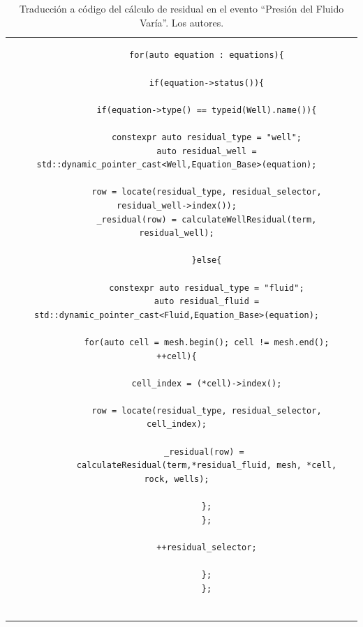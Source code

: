 \begin{appendix}
\begin{table}[h]
\begin{tabular}{cc}
\begin{tiny}
\begin{lstlisting}
			for(auto equation : equations){
			
			if(equation->status()){
			
			if(equation->type() == typeid(Well).name()){
			
			constexpr auto residual_type = "well";
			auto residual_well = std::dynamic_pointer_cast<Well,Equation_Base>(equation);
			
			row = locate(residual_type, residual_selector, residual_well->index());
			_residual(row) = calculateWellResidual(term, residual_well);
			
			}else{
			
			constexpr auto residual_type = "fluid";
			auto residual_fluid = std::dynamic_pointer_cast<Fluid,Equation_Base>(equation);
			
			for(auto cell = mesh.begin(); cell != mesh.end(); ++cell){
			
			cell_index = (*cell)->index();
			
			row = locate(residual_type, residual_selector, cell_index);
			
			_residual(row) = 
			calculateResidual(term,*residual_fluid, mesh, *cell, rock, wells);
			
			};
			};
			
			++residual_selector;
			
			};
			};
			
			\end{lstlisting}
		\end{tiny}
	\end{tabular}
	\label{tab:ResidualCode}
	\caption[Traducción a código del cálculo de residual en el evento ``Presión del Fluido Varía''.]{Traducción a código del cálculo de residual en el evento ``Presión del Fluido Varía''. Los autores.}
\end{table}



\end{appendix}

